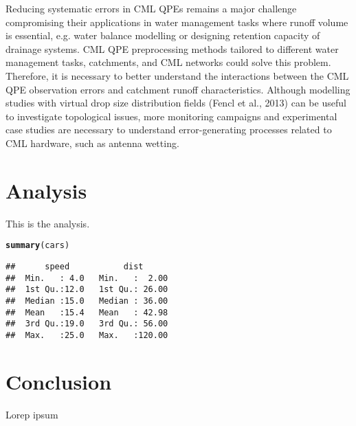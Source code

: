 \documentclass{ctuthesis}\usepackage[]{graphicx}\usepackage[]{color}
\makeatletter
\newcommand{\hlstd}[1]{\textcolor[rgb]{0.345,0.345,0.345}{#1}}%
\newcommand{\hlkwd}[1]{\textcolor[rgb]{0.737,0.353,0.396}{\textbf{#1}}}%
\newenvironment{kframe}{%
 \def\at@end@of@kframe{}%
 \ifinner\ifhmode%
  \def\at@end@of@kframe{\end{minipage}}%
  \begin{minipage}{\columnwidth}%
 \fi\fi%
 \def\FrameCommand##1{\hskip\@totalleftmargin \hskip-\fboxsep
 \colorbox{shadecolor}{##1}\hskip-\fboxsep
     \hskip-\linewidth \hskip-\@totalleftmargin \hskip\columnwidth}%
 \MakeFramed {\advance\hsize-\width
   \@totalleftmargin\z@ \linewidth\hsize
   \@setminipage}}%
 {\par\unskip\endMakeFramed%
 \at@end@of@kframe}
\newenvironment{knitrout}{}{} %
\makeatother
\begin{document}
Reducing systematic errors in CML QPEs remains a major challenge compromising their applications in water management tasks where runoff volume is essential, e.g. water balance modelling or designing retention capacity of drainage systems. CML QPE preprocessing methods tailored to different water management tasks, catchments, and CML networks could solve this problem. Therefore, it is necessary to better understand the interactions between the CML QPE observation errors and catchment runoff characteristics. Although modelling studies with virtual drop size distribution fields (Fencl et al., 2013) can be useful to investigate topological issues, more monitoring campaigns and experimental case studies are necessary to understand error-generating processes related to CML hardware, such as antenna wetting.





        
        
        


\chapter{Analysis}
This is the analysis.

\begin{knitrout}
\color{fgcolor}\begin{kframe}
\begin{alltt}
\hlkwd{summary}\hlstd{(cars)}
\end{alltt}
\begin{verbatim}
##      speed           dist       
##  Min.   : 4.0   Min.   :  2.00  
##  1st Qu.:12.0   1st Qu.: 26.00  
##  Median :15.0   Median : 36.00  
##  Mean   :15.4   Mean   : 42.98  
##  3rd Qu.:19.0   3rd Qu.: 56.00  
##  Max.   :25.0   Max.   :120.00
\end{verbatim}
\end{kframe}
\end{knitrout}
        
        
        
        \chapter{Conclusion}
        Lorep ipsum \cite{doe}
        
  
      
  
         
        
    
\end{document}
